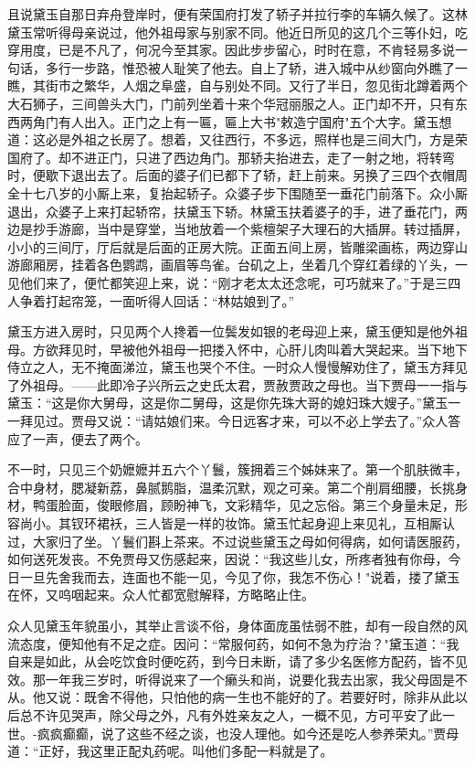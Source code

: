 且说黛玉自那日弃舟登岸时，便有荣国府打发了轿子并拉行李的车辆久候了。这林黛玉常听得母亲说过，他外祖母家与别家不同。他近日所见的这几个三等仆妇，吃穿用度，已是不凡了，何况今至其家。因此步步留心，时时在意，不肯轻易多说一句话，多行一步路，惟恐被人耻笑了他去。自上了轿，进入城中从纱窗向外瞧了一瞧，其街市之繁华，人烟之阜盛，自与别处不同。又行了半日，忽见街北蹲着两个大石狮子，三间兽头大门，门前列坐着十来个华冠丽服之人。正门却不开，只有东西两角门有人出入。正门之上有一匾，匾上大书"敕造宁国府"五个大字。黛玉想道：这必是外祖之长房了。想着，又往西行，不多远，照样也是三间大门，方是荣国府了。却不进正门，只进了西边角门。那轿夫抬进去，走了一射之地，将转弯时，便歇下退出去了。后面的婆子们已都下了轿，赶上前来。另换了三四个衣帽周全十七八岁的小厮上来，复抬起轿子。众婆子步下围随至一垂花门前落下。众小厮退出，众婆子上来打起轿帘，扶黛玉下轿。林黛玉扶着婆子的手，进了垂花门，两边是抄手游廊，当中是穿堂，当地放着一个紫檀架子大理石的大插屏。转过插屏，小小的三间厅，厅后就是后面的正房大院。正面五间上房，皆雕梁画栋，两边穿山游廊厢房，挂着各色鹦鹉，画眉等鸟雀。台矶之上，坐着几个穿红着绿的丫头，一见他们来了，便忙都笑迎上来，说：“刚才老太太还念呢，可巧就来了。”于是三四人争着打起帘笼，一面听得人回话：“林姑娘到了。”

黛玉方进入房时，只见两个人搀着一位鬓发如银的老母迎上来，黛玉便知是他外祖母。方欲拜见时，早被他外祖母一把搂入怀中，心肝儿肉叫着大哭起来。当下地下侍立之人，无不掩面涕泣，黛玉也哭个不住。一时众人慢慢解劝住了，黛玉方拜见了外祖母。——此即冷子兴所云之史氏太君，贾赦贾政之母也。当下贾母一一指与黛玉：“这是你大舅母，这是你二舅母，这是你先珠大哥的媳妇珠大嫂子。”黛玉一一拜见过。贾母又说：“请姑娘们来。今日远客才来，可以不必上学去了。”众人答应了一声，便去了两个。

不一时，只见三个奶嬷嬷并五六个丫鬟，簇拥着三个姊妹来了。第一个肌肤微丰，合中身材，腮凝新荔，鼻腻鹅脂，温柔沉默，观之可亲。第二个削肩细腰，长挑身材，鸭蛋脸面，俊眼修眉，顾盼神飞，文彩精华，见之忘俗。第三个身量未足，形容尚小。其钗环裙袄，三人皆是一样的妆饰。黛玉忙起身迎上来见礼，互相厮认过，大家归了坐。丫鬟们斟上茶来。不过说些黛玉之母如何得病，如何请医服药，如何送死发丧。不免贾母又伤感起来，因说：“我这些儿女，所疼者独有你母，今日一旦先舍我而去，连面也不能一见，今见了你，我怎不伤心！"说着，搂了黛玉在怀，又呜咽起来。众人忙都宽慰解释，方略略止住。

众人见黛玉年貌虽小，其举止言谈不俗，身体面庞虽怯弱不胜，却有一段自然的风流态度，便知他有不足之症。因问：“常服何药，如何不急为疗治？"黛玉道：“我自来是如此，从会吃饮食时便吃药，到今日未断，请了多少名医修方配药，皆不见效。那一年我三岁时，听得说来了一个癞头和尚，说要化我去出家，我父母固是不从。他又说：既舍不得他，只怕他的病一生也不能好的了。若要好时，除非从此以后总不许见哭声，除父母之外，凡有外姓亲友之人，一概不见，方可平安了此一世。-疯疯癫癫，说了这些不经之谈，也没人理他。如今还是吃人参养荣丸。”贾母道：“正好，我这里正配丸药呢。叫他们多配一料就是了。

